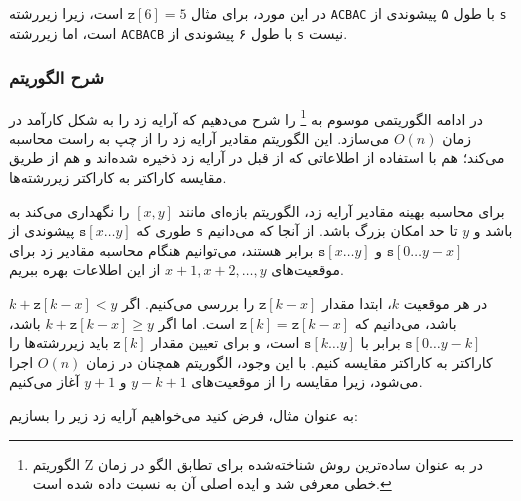 در این مورد، برای مثال $\texttt{z}[6]=5$ است،
زیرا زیررشته \texttt{ACBAC} با طول ۵
پیشوندی از \texttt{s} است،
اما زیررشته \texttt{ACBACB} با طول ۶
پیشوندی از \texttt{s} نیست.

\subsubsection*{شرح الگوریتم}

در ادامه الگوریتمی موسوم به \footnote{الگوریتم Z در \cite{gus97} به عنوان ساده‌ترین روش شناخته‌شده برای تطابق الگو در زمان خطی معرفی شد و ایده اصلی آن به \cite{mai84} نسبت داده شده است.} را شرح می‌دهیم که آرایه زد را به شکل کارآمد در زمان $O(n)$ می‌سازد.
این الگوریتم مقادیر آرایه زد را از چپ به راست محاسبه می‌کند؛ هم با استفاده از اطلاعاتی که از قبل در آرایه زد ذخیره شده‌اند و هم از طریق مقایسه کاراکتر به کاراکتر زیررشته‌ها.

برای محاسبه بهینه مقادیر آرایه زد، الگوریتم بازه‌ای مانند $[x,y]$ را نگهداری می‌کند به طوری که $\texttt{s}[x \ldots y]$ پیشوندی از \texttt{s} باشد و $y$ تا حد امکان بزرگ باشد.
از آنجا که می‌دانیم $\texttt{s}[0 \ldots y-x]$ و $\texttt{s}[x \ldots y]$ برابر هستند، می‌توانیم هنگام محاسبه مقادیر زد برای موقعیت‌های $x+1,x+2,\ldots,y$ از این اطلاعات بهره ببریم.

در هر موقعیت $k$، ابتدا مقدار $\texttt{z}[k-x]$ را بررسی می‌کنیم.
اگر $k+\texttt{z}[k-x]<y$ باشد، می‌دانیم که $\texttt{z}[k]=\texttt{z}[k-x]$ است.
اما اگر $k+\texttt{z}[k-x] \ge y$ باشد، $\texttt{s}[0 \ldots y-k]$ برابر با $\texttt{s}[k \ldots y]$ است، و برای تعیین مقدار $\texttt{z}[k]$ باید زیررشته‌ها را کاراکتر به کاراکتر مقایسه کنیم.
با این وجود، الگوریتم همچنان در زمان $O(n)$ اجرا می‌شود، زیرا مقایسه را از موقعیت‌های $y-k+1$ و $y+1$ آغاز می‌کنیم.

به عنوان مثال، فرض کنید می‌خواهیم آرایه زد زیر را بسازیم:

